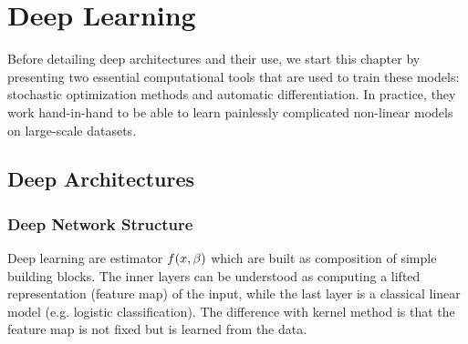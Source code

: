 
\chapter{Deep Learning}
\label{c-deep-learning}



Before detailing deep architectures and their use, we start this chapter by presenting two essential computational tools that are used to train these models: stochastic optimization methods and automatic differentiation. In practice, they work hand-in-hand to be able to learn painlessly complicated non-linear models on large-scale datasets. 



%


\section{Deep Architectures}
\label{sec-deepnet-discr}

\subsection{Deep Network Structure}
\label{sec-deep-structure}

Deep learning are estimator $f(x,\beta)$ which are built as composition of simple building blocks.
%
The inner layers can be understood as computing a lifted representation (feature map) of the input, while the last layer is a classical linear model (e.g. logistic classification). The difference with kernel method is that the feature map is not fixed but is learned from the data. 

